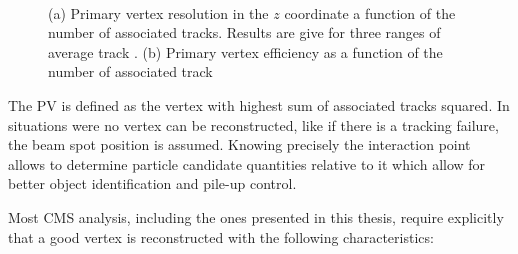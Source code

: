 \begin{figure}[htp]%
\centering
{}\qquad
{}\\
\caption[Primary vertex resolution in the $z$ coordinate and vertex reconstruction efficiency as a function of the number of constituent tracks.]{(a) Primary vertex resolution in the $z$ coordinate a function of the number of associated tracks. Results are give for three ranges of average track \pt. (b) Primary vertex efficiency as a function of the number of associated track \cite{ARTICLE:CMSTrackingAndPrimaryVertex}}
\label{FIGURE:EventReconstructionAndSimulation_Vertex}
\end{figure}

The \gls{PV} is defined as the vertex with highest sum of associated tracks \pt squared. In situations were no vertex can be reconstructed, like if there is a tracking failure, the beam spot position is assumed. Knowing precisely the interaction point allows to determine particle candidate quantities relative to it which allow for better object identification and pile-up control. 

Most \gls{CMS} analysis, including the ones presented in this thesis, require explicitly that a good vertex is reconstructed with the following characteristics:

